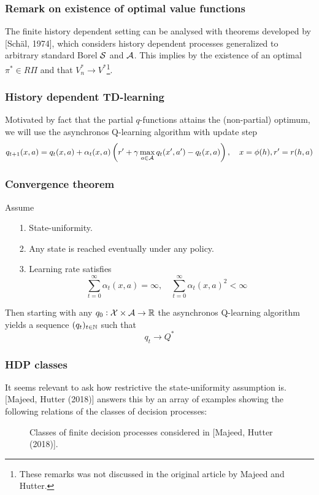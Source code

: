 \documentclass{beamer}[10]
\begin{document}
\begin{frame}
  \frametitle{Remark on existence of optimal value functions}
  The finite history dependent setting
  can be analysed with theorems developed by [Schäl, 1974],
  which considers history dependent processes generalized to arbitrary
  standard Borel $\mathcal{S}$ and $\mathcal{A}$.
  This implies by the existence of an optimal
  $\pi^* \in R\Pi$ and that $V^*_n \to V^*$\footnote{These remarks was not
  discussed in the original article by Majeed and Hutter.}.
\end{frame}

\begin{frame}
  \frametitle{History dependent TD-learning}
  Motivated by fact that the partial $q$-functions attains
  the (non-partial) optimum, we will use the asynchronos 
  Q-learning algorithm with update step
  \[ q_{t+1}(x, a) = q_t(x, a) + \alpha_t(x, a)
    \left(r' + \gamma \max_{a \in \mathcal{A}} q_t(x', a') - q_t(x, a)\right),
  \quad x = \phi(h), r' = r(h,a) \]
\end{frame}

\begin{frame}
  \frametitle{Convergence theorem}
  \begin{thm}
    Assume
    \begin{itemize}
      \item[1.] State-uniformity.
      \item[2.] Any state is reached eventually under any policy.
      \item[3.] Learning rate satisfies
	\[ \sum_{t=0}^\infty \alpha_t(x, a) = \infty, \quad
	\sum_{t=0}^\infty \alpha_t(x, a)^2 < \infty \]
    \end{itemize}
    Then starting with any $q_0 : \mathcal{X} \times \mathcal{A} \to \mathbb{R}$
    the asynchronos Q-learning algorithm yields a sequence
    $(q_t)_{t \in \mathbb{N}}$ such that
    \[q_t \to Q^* \] 
  \end{thm}
\end{frame}

\begin{frame}
  \frametitle{HDP classes}
  \begin{footnotesize}
  It seems relevant to ask how restrictive the state-uniformity assumption is.
  [Majeed, Hutter (2018)]
  answers this by an array of examples showing the following
  relations of the classes of decision processes:
  \begin{figure}[H]
    \centering
    \caption{Classes of finite decision processes considered in
      [Majeed, Hutter (2018)].
    }
  \end{figure}
\end{footnotesize}
\end{frame}
\end{document}
